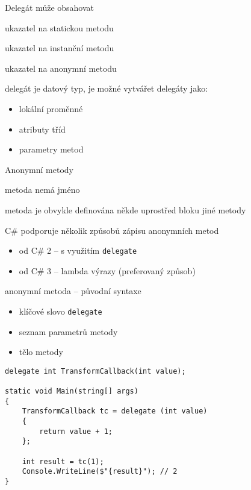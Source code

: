 \begin{frame}[fragile]
\vfill
\begin{bitemize}{Delegát může obsahovat}
\item ukazatel na statickou metodu
\item ukazatel na instanční metodu
\item ukazatel na anonymní metodu
\end{bitemize}
\vfill
\begin{bitemize}{}
\item delegát je datový typ, je možné vytvářet delegáty jako:
\begin{itemize}
\item lokální proměnné 
\item atributy tříd
\item parametry metod
\end{itemize}

\end{bitemize}
\vfill
\end{frame}





\begin{frame}[fragile]
\begin{bitemize}{Anonymní metody}
\item metoda nemá jméno
\item metoda je obvykle definována někde uprostřed bloku jiné metody
\item C\# podporuje několik způsobů zápisu anonymních metod
\begin{itemize}
\item od C\# 2 -- s využitím \lstinline|delegate|
\item od C\# 3 -- lambda výrazy (preferovaný způsob)
\end{itemize}

\end{bitemize}
\end{frame}


\begin{frame}[fragile]
\begin{bitemize}{}
\item anonymní metoda -- původní syntaxe
\begin{itemize}
\item klíčové slovo \lstinline|delegate|
\item seznam parametrů metody
\item tělo metody
\end{itemize}
\end{bitemize}
\vfill
\begin{yesblock}
\begin{lstlisting}
delegate int TransformCallback(int value);

static void Main(string[] args)
{
    TransformCallback tc = delegate (int value)
    {
        return value + 1;
    };

    int result = tc(1);
    Console.WriteLine($"{result}"); // 2
}
\end{lstlisting}
\end{yesblock}
\end{frame}




